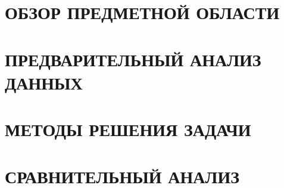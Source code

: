 \documentclass[a4paper,14pt,russian]{extreport}
\begin{document}

\tableofcontents

\newpage
{}


\chapter{ОБЗОР ПРЕДМЕТНОЙ ОБЛАСТИ}


\chapter{ПРЕДВАРИТЕЛЬНЫЙ АНАЛИЗ ДАННЫХ}


\chapter{МЕТОДЫ РЕШЕНИЯ ЗАДАЧИ}


\chapter{СРАВНИТЕЛЬНЫЙ АНАЛИЗ}


\newpage
{}


\newpage


\newpage
\listoffigures
\newpage
\listoftables
\newpage
\listoflistings
\end{document}
